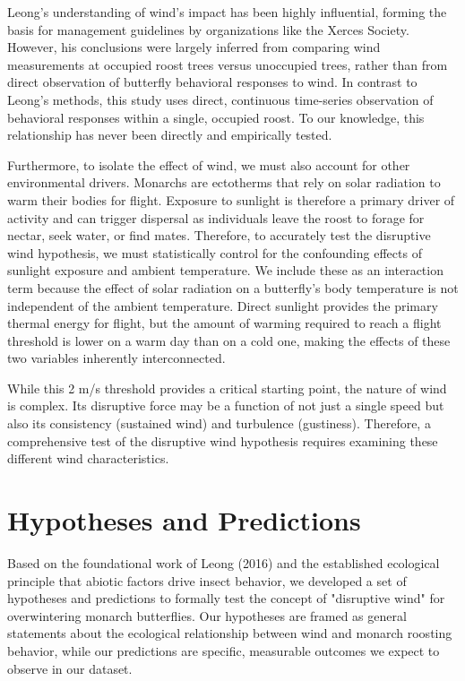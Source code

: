 Leong's understanding of wind's impact has been highly influential, forming the basis for management guidelines by organizations like the Xerces Society. However, his conclusions were largely inferred from comparing wind measurements at occupied roost trees versus unoccupied trees, rather than from direct observation of butterfly behavioral responses to wind. In contrast to Leong's methods, this study uses direct, continuous time-series observation of behavioral responses within a single, occupied roost. To our knowledge, this relationship has never been directly and empirically tested.

Furthermore, to isolate the effect of wind, we must also account for other environmental drivers. Monarchs are ectotherms that rely on solar radiation to warm their bodies for flight. Exposure to sunlight is therefore a primary driver of activity and can trigger dispersal as individuals leave the roost to forage for nectar, seek water, or find mates. Therefore, to accurately test the disruptive wind hypothesis, we must statistically control for the confounding effects of sunlight exposure and ambient temperature. We include these as an interaction term because the effect of solar radiation on a butterfly's body temperature is not independent of the ambient temperature. Direct sunlight provides the primary thermal energy for flight, but the amount of warming required to reach a flight threshold is lower on a warm day than on a cold one, making the effects of these two variables inherently interconnected.

While this 2 m/s threshold provides a critical starting point, the nature of wind is complex. Its disruptive force may be a function of not just a single speed but also its consistency (sustained wind) and turbulence (gustiness). Therefore, a comprehensive test of the disruptive wind hypothesis requires examining these different wind characteristics.

\section{Hypotheses and Predictions}
\label{sec:hypotheses}

Based on the foundational work of Leong (2016) and the established ecological principle that abiotic factors drive insect behavior, we developed a set of hypotheses and predictions to formally test the concept of "disruptive wind" for overwintering monarch butterflies. Our hypotheses are framed as general statements about the ecological relationship between wind and monarch roosting behavior, while our predictions are specific, measurable outcomes we expect to observe in our dataset.

